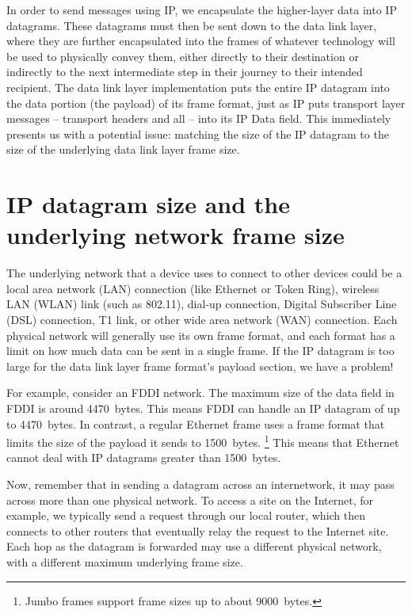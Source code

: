 In order to send messages using IP, we encapsulate the higher-layer data into IP datagrams.
These datagrams must then be sent down to the data link layer,
where they are further encapsulated into the frames of whatever technology will be used to physically convey them,
either directly to their destination or indirectly to the next intermediate step in their journey to their intended recipient.
The data link layer implementation puts the entire IP datagram into the data portion (the payload) of its frame format,
just as IP puts transport layer messages -- transport headers and all -- into its IP Data field.
This immediately presents us with a potential issue: matching the size of the IP datagram to the size of the underlying data link layer frame size.




\section{IP datagram size and the underlying network frame size}

The underlying network that a device uses to connect to other devices
could be a local area network (LAN) connection (like Ethernet or Token
Ring), wireless LAN (WLAN) link (such as 802.11), dial-up connection,
Digital Subscriber Line (DSL) connection, T1 link, or other wide area
network (WAN) connection. Each physical network will generally use its
own frame format, and each format has a limit on how much data can be
sent in a single frame. If the IP datagram is too large for the data
link layer frame format's payload section, we have a problem!

For example, consider an FDDI network.
The maximum size of the data field in FDDI is around 4470~bytes.
This means FDDI can handle an IP datagram of up to 4470~bytes.
In contrast, a regular Ethernet frame uses a frame format that limits the size of the payload it sends to 1500~bytes.%
\footnote{Jumbo frames support frame sizes up to about 9000~bytes.}
This means that Ethernet cannot deal with IP datagrams greater than 1500~bytes.

Now, remember that in sending a datagram across an internetwork, it may pass across more than one physical network.
To access a site on the Internet, for example, we typically send a request through our local router,
which then connects to other routers that eventually relay the request to the Internet site.
Each hop as the datagram is forwarded may use a different physical network, with a different maximum underlying frame size.

